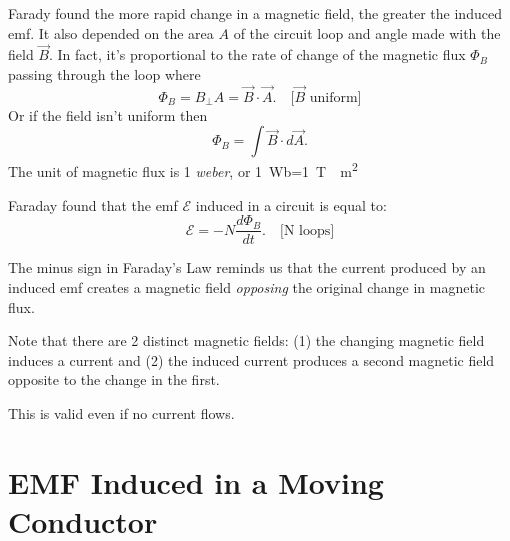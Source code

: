 \begin{remark}
    Farady found the more rapid change in a magnetic field, the greater the induced emf. It also depended on the area $A$ of the circuit loop and angle made with the field $\vec{B}$. In fact, it's proportional to the rate of change of the magnetic flux $\Phi_B$ passing through the loop where $$\Phi_B = B_\perp A = \vec{B} \cdot \vec{A}. \quad \text{[$\vec{B}$ uniform]}$$ Or if the field isn't uniform then $$\Phi_B = \int\vec{B}\cdot d\vec{A}.$$ The unit of magnetic flux  is 1 \emph{weber}, or \qty{1}{Wb}=\qty{1}{T\cdot m^2}
\end{remark}
\begin{definition}
    Faraday found that the emf $\mathscr{E}$ induced in a circuit is equal to: $$\mathscr{E} = -N\frac{d\Phi_B}{dt}. \quad\text{[N loops]}$$
\end{definition}
\begin{remark}
    The minus sign in Faraday's Law reminds us that the current produced by an induced emf creates a magnetic field \emph{opposing} the original change in magnetic flux.
\end{remark}
\begin{remark}
    Note that there are 2 distinct magnetic fields: (1) the changing magnetic field induces a current and (2) the induced current produces a second magnetic field opposite to the change in the first.
\end{remark}
\begin{note}
    This is valid even if no current flows.
\end{note}

\section{EMF Induced in a Moving Conductor}

